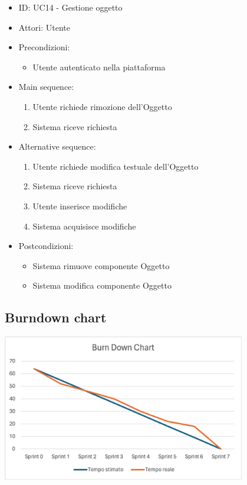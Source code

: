 \documentclass{article}
\begin{document}
\begin{itemize}[label = {-}]
    \itemsep0px
    \item ID: UC14 - Gestione oggetto
    \item Attori: Utente
    \item Precondizioni: 
        \begin{itemize}[label = {-}]
            \item Utente autenticato nella piattaforma
        \end{itemize}
    \item Main sequence: 
        \begin{enumerate}
            \item Utente richiede rimozione dell'Oggetto
            \item Sistema riceve richiesta
        \end{enumerate}
    \item Alternative sequence:
        \begin{enumerate}
            \item Utente richiede modifica testuale dell'Oggetto
            \item Sistema riceve richiesta
            \item Utente inserisce modifiche
            \item Sistema acquisisce modifiche
        \end{enumerate}
    \item Postcondizioni: 
        \begin{itemize}[label = {-}]
            \item Sistema rimuove componente Oggetto
            \item Sistema modifica componente Oggetto
        \end{itemize}
\end{itemize}

\subsection{Burndown chart}
\large
\begin{center}
    \includegraphics[width=0.8\textwidth]{foto3.png}
\end{center}
\end{document}
